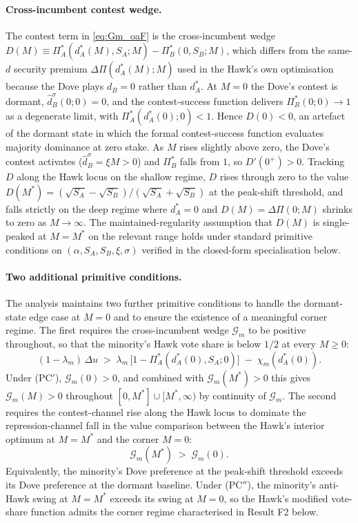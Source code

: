 \documentclass[11pt,twoside]{extarticle}
\begin{document}
\paragraph{Cross-incumbent contest wedge.} The contest term in \eqref{eq:Gm_oaF} is the cross-incumbent wedge
$D(M)\equiv\Pi_A^{*}(d_A^{*}(M),S_A;M)-\Pi_B^{*}(0,S_B;M)$,
which differs from the same-$d$ security premium $\Delta\Pi(d_A^{*}(M);M)$ used in the Hawk's own optimisation because the Dove plays $d_B=0$ rather than $d_A^{*}$. At $M=0$ the Dove's contest is dormant, $\hat d^\sigma_B(0;0)=0$, and the contest-success function delivers $\Pi_B^{*}(0;0)\to 1$ as a degenerate limit, with $\Pi_A^{*}(d_A^{*}(0);0)<1$. Hence $D(0)<0$, an artefact of the dormant state in which the formal contest-success function evaluates majority dominance at zero stake. As $M$ rises slightly above zero, the Dove's contest activates ($\hat d^\sigma_B=\xi M>0$) and $\Pi_B^{*}$ falls from $1$, so $D'(0^+)>0$. Tracking $D$ along the Hawk locus on the shallow regime, $D$ rises through zero to the value $D(M^{*})=(\sqrt{S_A}-\sqrt{S_B})/(\sqrt{S_A}+\sqrt{S_B})$ at the peak-shift threshold, and falls strictly on the deep regime where $d_A^{*}=0$ and $D(M)=\Delta\Pi(0;M)$ shrinks to zero as $M\to\infty$. The maintained-regularity assumption that $D(M)$ is single-peaked at $M=M^{*}$ on the relevant range holds under standard primitive conditions on $(\alpha,S_A,S_B,\xi,\sigma)$ verified in the closed-form specialisation below.

\paragraph{Two additional primitive conditions.} The analysis maintains two further primitive conditions to handle the dormant-state edge case at $M=0$ and to ensure the existence of a meaningful corner regime. The first requires the cross-incumbent wedge $\mathcal G_m$ to be positive throughout, so that the minority's Hawk vote share is below $1/2$ at every $M\ge 0$:
\begin{equation}\label{eq:PCprime_oaF}
    (1-\lambda_m)\,\Delta u\;>\;\lambda_m\,\big[1-\Pi_A^{*}(d_A^{*}(0),S_A;0)\big]\;-\;\chi_m(d_A^{*}(0)).\tag{PC$'$}
\end{equation}
Under (PC$'$), $\mathcal G_m(0)>0$, and combined with $\mathcal G_m(M^{*})>0$ this gives $\mathcal G_m(M)>0$ throughout $[0,M^{*}]\cup[M^{*},\infty)$ by continuity of $\mathcal G_m$. The second requires the contest-channel rise along the Hawk locus to dominate the repression-channel fall in the value comparison between the Hawk's interior optimum at $M=M^{*}$ and the corner $M=0$:
\begin{equation}\label{eq:PCdoubleprime_oaF}
    \mathcal G_m(M^{*})\;>\;\mathcal G_m(0).\tag{PC$''$}
\end{equation}
Equivalently, the minority's Dove preference at the peak-shift threshold exceeds its Dove preference at the dormant baseline. Under (PC$''$), the minority's anti-Hawk swing at $M=M^{*}$ exceeds its swing at $M=0$, so the Hawk's modified vote-share function admits the corner regime characterised in Result F2 below.
\end{document}
